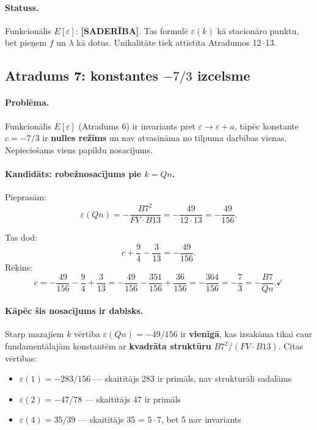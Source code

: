 \documentclass[12pt,a4paper]{article}
\begin{document}
\paragraph{Statuss.}
Funkcionālis $E[\varepsilon]$: \textbf{[SADERĪBA]}. Tas formulē $\varepsilon(k)$ kā stacionāro punktu, bet pieņem $f$ un $\lambda$ kā dotus. Unikalitāte tiek attīstīta Atradumos 12--13.

\subsection*{Atradums 7: konstantes $-7/3$ izcelsme}

\paragraph{Problēma.}
Funkcionālis $E[\varepsilon]$ (Atradums 6) ir invariants pret $\varepsilon \to \varepsilon + a$, tāpēc konstante $c = -7/3$ ir \textbf{nulles režīms} un nav atvasināma no tilpuma darbības vienas. Nepieciešams viens papildu nosacījums.

\paragraph{Kandidāts: robežnosacījums pie $k = Qn$.}
Pieprasām:
\[
\varepsilon(Qn) = -\frac{B7^2}{FV \cdot B13} = -\frac{49}{12 \cdot 13} = -\frac{49}{156}.
\]

Tas dod:
\[
c + \frac{9}{4} - \frac{3}{13} = -\frac{49}{156}.
\]
Rēķins:
\[
c = -\frac{49}{156} - \frac{9}{4} + \frac{3}{13} = -\frac{49}{156} - \frac{351}{156} + \frac{36}{156} = -\frac{364}{156} = -\frac{7}{3} = -\frac{B7}{Qn}. \checkmark
\]

\paragraph{Kāpēc šis nosacījums ir dabisks.}
Starp mazajiem $k$ vērtība $\varepsilon(Qn) = -49/156$ ir \textbf{vienīgā}, kas izsakāma tikai caur fundamentālajām konstantēm ar \textbf{kvadrāta struktūru} $B7^2/(FV \cdot B13)$. Citas vērtības:
\begin{itemize}
    \item $\varepsilon(1) = -283/156$ — skaitītājs 283 ir primāls, nav strukturāli sadalāms
    \item $\varepsilon(2) = -47/78$ — skaitītājs 47 ir primāls
    \item $\varepsilon(4) = 35/39$ — skaitītājs 35 = $5 \cdot 7$, bet 5 nav invariants
\end{itemize}
\end{document}
